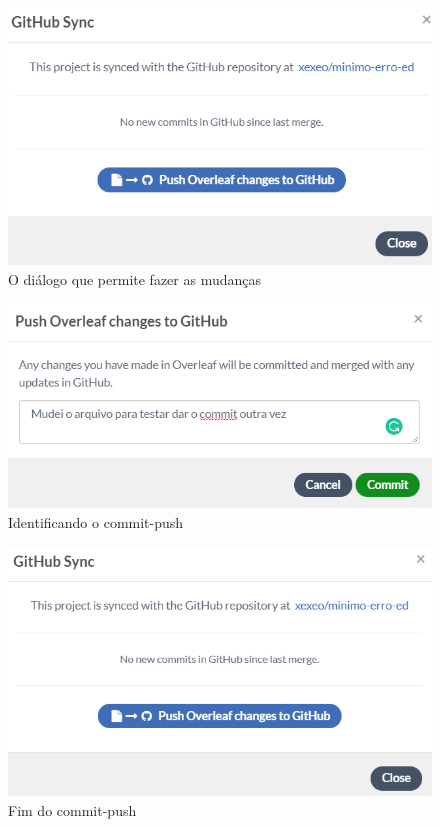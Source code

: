 \documentclass{article}
\begin{document}
\begin{figure}[hbt]
    \centering
    \includegraphics[width=0.9\linewidth]{Image005.png}
    \caption{O diálogo que permite fazer as mudanças}
    \label{fig:diag1}
\end{figure}

\begin{figure}[hbt]
    \centering
    \includegraphics[width=0.9\linewidth]{Image006.png}
    \caption{Identificando o commit-push}
    \label{fig:commitpush}
\end{figure}

\begin{figure}[hbt]
    \centering
    \includegraphics[width=0.9\linewidth]{Image007.png}
    \caption{Fim do commit-push}
    \label{fig:fimdocp}
\end{figure}
\end{document}
